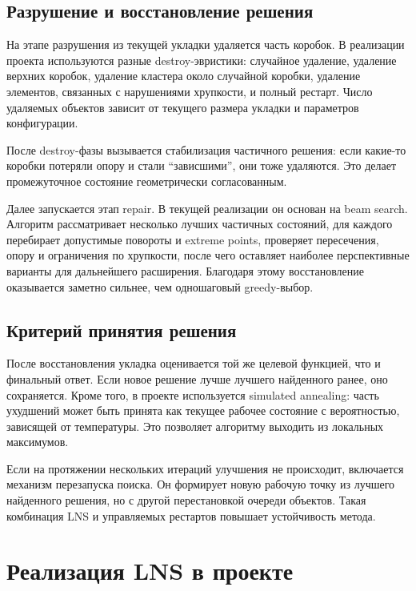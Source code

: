 \documentclass[12pt,a4paper]{article}
\begin{document}
\subsection{Разрушение и восстановление решения}

На этапе разрушения из текущей укладки удаляется часть коробок. В реализации проекта используются разные destroy-эвристики: случайное удаление, удаление верхних коробок, удаление кластера около случайной коробки, удаление элементов, связанных с нарушениями хрупкости, и полный рестарт. Число удаляемых объектов зависит от текущего размера укладки и параметров конфигурации.

После destroy-фазы вызывается стабилизация частичного решения: если какие-то коробки потеряли опору и стали ``зависшими'', они тоже удаляются. Это делает промежуточное состояние геометрически согласованным.

Далее запускается этап repair. В текущей реализации он основан на beam search. Алгоритм рассматривает несколько лучших частичных состояний, для каждого перебирает допустимые повороты и extreme points, проверяет пересечения, опору и ограничения по хрупкости, после чего оставляет наиболее перспективные варианты для дальнейшего расширения. Благодаря этому восстановление оказывается заметно сильнее, чем одношаговый greedy-выбор.

\subsection{Критерий принятия решения}

После восстановления укладка оценивается той же целевой функцией, что и финальный ответ. Если новое решение лучше лучшего найденного ранее, оно сохраняется. Кроме того, в проекте используется simulated annealing: часть ухудшений может быть принята как текущее рабочее состояние с вероятностью, зависящей от температуры. Это позволяет алгоритму выходить из локальных максимумов.

Если на протяжении нескольких итераций улучшения не происходит, включается механизм перезапуска поиска. Он формирует новую рабочую точку из лучшего найденного решения, но с другой перестановкой очереди объектов. Такая комбинация LNS и управляемых рестартов повышает устойчивость метода.

\section{Реализация LNS в проекте}
\end{document}
